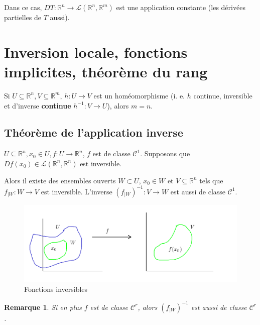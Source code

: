 \documentclass[french]{article}
\newtheorem*{remark}{Remarque}
\begin{document}
Dans ce cas, $DT : \mathbb{R}^n \to \mathscr{L}(\mathbb{R}^n, \mathbb{R}^m) $ est une application constante (les dérivées partielles de $T$ aussi).

\section{Inversion locale, fonctions implicites, théorème du rang}


\begin{thm}[de Bronner]
  Si $U \subseteq \mathbb{R}^n, V \subseteq \mathbb{R}^m$, $h : U \to V$ est un homéomorphisme (i. e. $h$ continue, inversible et d'inverse \textbf{continue} $h ^{-1} : V \to U$), alors $m=n$.
\end{thm}

\subsection{Théorème de l'application inverse}


\begin{thm}
  $U \subseteq \mathbb{R}^n, x_0 \in U, f : U \to \mathbb{R}^{n}$, $f$ est de classe $\mathcal{C}^1$. Supposons que $Df(x_0) \in \mathscr{L}(\mathbb{R}^n, \mathbb{R}^n) $ est inversible.

  Alors il existe des ensembles ouverts $W \subset U$, $x_0 \in W$ et $V \subseteq \mathbb{R}^n$ tels que $f _{|W} : W \to V$ est inversible. L'inverse $(f _{|W}) ^{-1} : V \to W$ est aussi de classe $\mathcal{C}^1$.
\end{thm}

\begin{figure}[h!]
  \centering
  \includegraphics[scale=0.3]{figures/fct_inv.png}
  \caption{Fonctions inversibles}
  \label{}
\end{figure}

\begin{remark}
  Si en plus $f$ est de classe $\mathcal{C}^r$, alors $(f _{|W}) ^{-1} $ est aussi de classe $\mathcal{C}^r$.
\end{remark}
\end{document}
